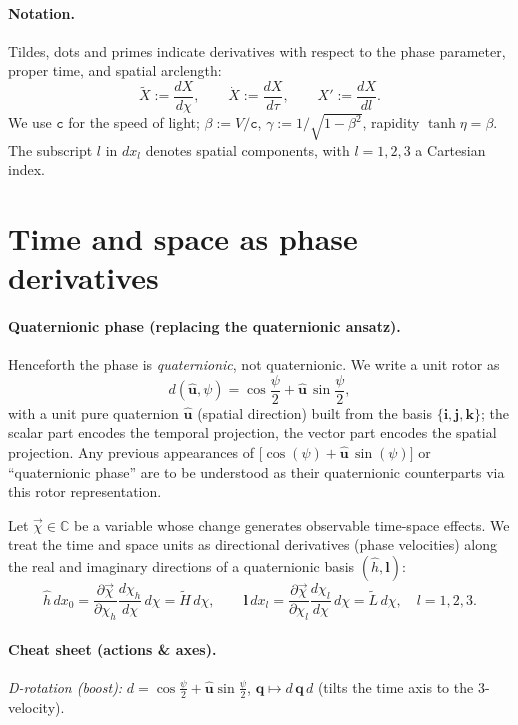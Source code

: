 \documentclass[11pt]{article}
\numberwithin{equation}{section}
\providecommand{\uhat}{\hat{\mathbf u}}
\begin{document}
\paragraph{Notation.} Tildes, dots and primes indicate derivatives with respect to the phase parameter, proper time, and spatial arclength:
\[
\tilde{X}:=\frac{dX}{d\chi},\qquad \dot{X}:=\frac{dX}{d\tau},\qquad X':=\frac{dX}{dl}.
\]
We use $\mathtt{c}$ for the speed of light; $\beta:=V/\mathtt{c}$, $\gamma:=1/\sqrt{1-\beta^2}$, rapidity $\tanh\eta=\beta$. The subscript $l$ in $dx_l$ denotes spatial components, with $l=1,2,3$ a Cartesian index.

\section{Time and space as phase derivatives}
\paragraph{Quaternionic phase (replacing the quaternionic ansatz).}
Henceforth the phase is \emph{quaternionic}, not quaternionic. We write a unit rotor as
\begin{equation}
d(\hat{\mathbf u},\psi)=\cos\frac{\psi}{2}+\hat{\mathbf u}\,\sin\frac{\psi}{2},
\end{equation}
with a unit pure quaternion $\hat{\mathbf u}$ (spatial direction) built from the basis
$\{\mathbf i,\mathbf j,\mathbf k\}$; the scalar part encodes the temporal projection,
the vector part encodes the spatial projection. Any previous appearances of
$\bigl[\cos(\psi)+\uhat\,\sin(\psi)\bigr]$ or ``quaternionic phase'' are to be understood as their quaternionic
counterparts via this rotor representation.

Let $\vec{\chi}\in\mathbb{C}$ be a variable whose change generates observable time-space effects. We treat the time and space units as directional derivatives (phase velocities) along the real and imaginary directions of a quaternionic basis $(\hat{h},\mathbf{l})$:
\begin{equation}
\hat{h}\,dx_0=\frac{\partial\vec{\chi}}{\partial\chi_h}\frac{d\chi_h}{d\chi}\,d\chi
=\tilde{H}\,d\chi,\qquad
\mathbf{l}\,dx_l=\frac{\partial\vec{\chi}}{\partial\chi_l}\frac{d\chi_l}{d\chi}\,d\chi
=\tilde{L}\,d\chi,\quad l=1,2,3.
\label{eq:11}
\end{equation}

\paragraph{Cheat sheet (actions \& axes).}
\emph{D-rotation (boost):} $d=\cos\frac{\psi}{2}+\hat{\mathbf u}\sin\frac{\psi}{2}$,\quad
$\displaystyle \mathbf q \mapsto d\,\mathbf q\,d$ (tilts the time axis to the 3-velocity).
\end{document}
